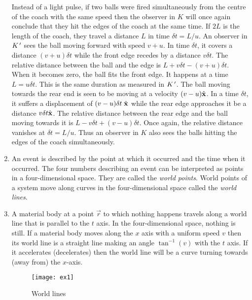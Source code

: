 \begin{enumerate}
Instead of a light pulse, if two balls were fired simultaneously from the 
centre of the coach with the same speed then the observer in $K$ will once 
again conclude that they hit the edges of the coach at the same time. If $2L$
is the length of the coach, they travel a distance $L$ in time $\delta t =L/u$.
An observer in $K^{\,\prime}$ sees the ball moving forward with speed $v + u$. In
time $\delta t$, it covers a distance $(v + u)\delta t$ while the front edge
recedes by a distance $v\delta t$. The relative distance between the ball and
the edge is $L + v\delta t - (v + u)\delta t$. When it becomes zero, the ball
fits the front edge. It happens at a time $L = u\delta t$. This is the same
duration as measured in $K^{\,\prime}$. The ball moving towards the rear end is 
seen to be moving at a velocity $(v - u)\hat{\mathbf{x}}$. In a time $\delta t$, it 
suffers a displacement of $(v - u)\delta t\;\hat{\mathbf{x}}$ while the rear edge 
approaches it be a distance $v\delta t\hat{\mathbf{x}}$. The relative distance between the
rear edge and the ball moving towards it is $L - v\delta t + (v - u)\delta t$.
Once again, the relative distance vanishes at $\delta t = L/u$. Thus an 
observer in $K$ also sees the balls hitting the edges of the coach 
simultaneously.

\item An event is described by the point at which it occurred and the time when 
it occurred. The four numbers describing an event can be interpreted as points 
in a four-dimensional space. They are called the \emph{world points}. World 
points of a system move along curves in the four-dimensional space called the 
\emph{world lines}.

\item A material body at a point $\vec{r}$ to which nothing happens travels 
along a world line that is parallel to the $t$ axis. In the four-dimensional 
space, nothing is still. If a material body moves along the $x$ axis with a 
uniform speed $v$ then its world line is a straight line making an angle 
$\tan^{-1}(v)$ with the $t$ axis. If it accelerates (decelerates) then the 
world line will be a curve turning towards (away from) the $x$-axis. 
\begin{figure}
\texttt{[image: ex1]}
\caption{World lines}
\label{c1f1}
\end{figure}


\end{enumerate}
